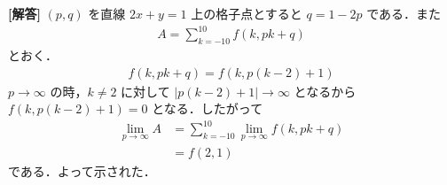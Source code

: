\documentclass[../../main.tex]{subfiles}
\begin{document}
\begin{oframed}
  
\end{oframed}

{\bf [解答]}
$(p, q)$ を直線 $2x+y=1$ 上の格子点とすると $q = 1-2p$ である．また
\begin{align}
  A = \sum_{k=-10}^{10} f(k, pk+q)
\end{align}
とおく．
\begin{align}
  f(k, pk+q) = f(k, p(k-2)+1)
\end{align}
$p \to \infty$ の時，$k \neq 2$ に対して $|p(k-2)+1| \to \infty$ となるから $f(k, p(k-2)+1) = 0$ となる．したがって
\begin{align}
  \lim_{p \to \infty} A
  &= \sum_{k=-10}^{10} \lim_{p \to \infty} f(k, pk+q) \\
  &= f(2, 1)
\end{align}
である．よって示された．

\newpage
\end{document}

